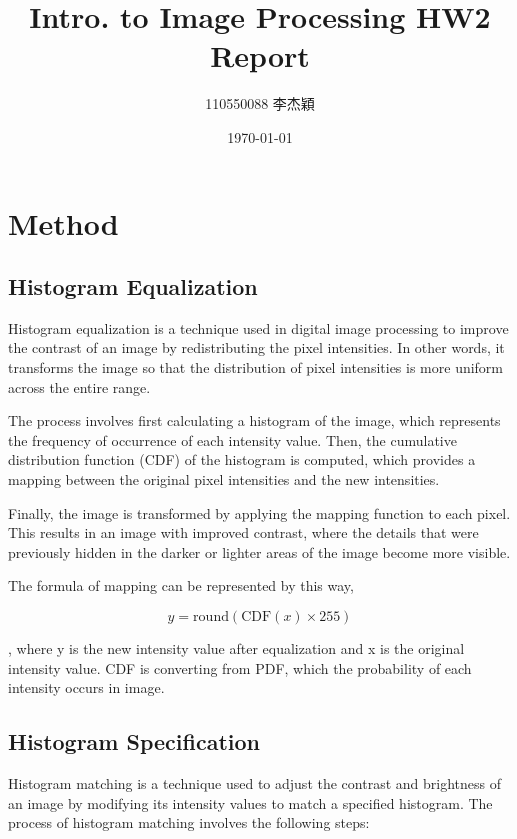 \documentclass[twocolumn]{extarticle}
\title{Intro. to Image Processing HW2 Report}
\author{110550088 李杰穎}
\date{\today}
\begin{document}
\maketitle

\section{Method}

\subsection{Histogram Equalization}

Histogram equalization is a technique used in digital image processing to improve the contrast of an image by redistributing the pixel intensities. In other words, it transforms the image so that the distribution of pixel intensities is more uniform across the entire range.

The process involves first calculating a histogram of the image, which represents the frequency of occurrence of each intensity value. Then, the cumulative distribution function (CDF) of the histogram is computed, which provides a mapping between the original pixel intensities and the new intensities.

Finally, the image is transformed by applying the mapping function to each pixel. This results in an image with improved contrast, where the details that were previously hidden in the darker or lighter areas of the image become more visible.

The formula of mapping can be represented by this way, 

\begin{equation}
y = \text{round}\left(\text{CDF}(x) \times 255\right)
\end{equation}

, where y is the new intensity value after equalization and x is the original intensity value. CDF is converting from PDF, which the probability of each intensity occurs in image.
\subsection{Histogram Specification}

Histogram matching is a technique used to adjust the contrast and brightness of an image by modifying its intensity values to match a specified histogram. The process of histogram matching involves the following steps:
\end{document}
